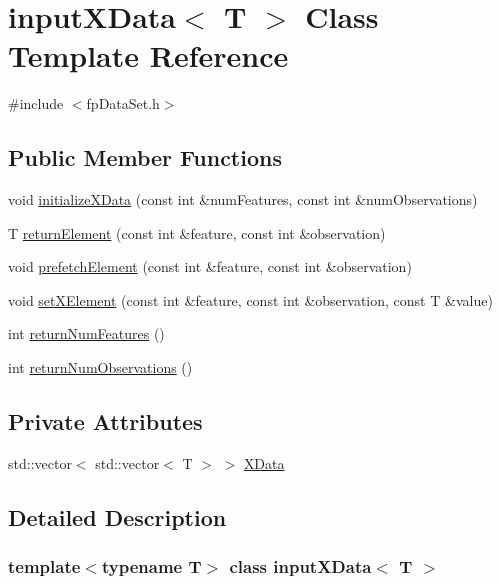 \hypertarget{classinputXData}{}\section{input\+X\+Data$<$ T $>$ Class Template Reference}
\label{classinputXData}


{\ttfamily \#include $<$fp\+Data\+Set.\+h$>$}

\subsection*{Public Member Functions}
\begin{DoxyCompactItemize}
\item 
void \hyperlink{classinputXData_a540e403a6520cb1747d0d08c7df18bf4}{initialize\+X\+Data} (const int \&num\+Features, const int \&num\+Observations)
\item 
T \hyperlink{classinputXData_a5eb6d788b282751f279605495351c42f}{return\+Element} (const int \&feature, const int \&observation)
\item 
void \hyperlink{classinputXData_a2e80664842e94288ea78bb2447b0f6f8}{prefetch\+Element} (const int \&feature, const int \&observation)
\item 
void \hyperlink{classinputXData_a8f59e3a3f79f9da1a032bffe66e182ed}{set\+X\+Element} (const int \&feature, const int \&observation, const T \&value)
\item 
int \hyperlink{classinputXData_ad10e112909314a795628784bb9fc7e8b}{return\+Num\+Features} ()
\item 
int \hyperlink{classinputXData_a127317d1c076a4a891e20386db93f008}{return\+Num\+Observations} ()
\end{DoxyCompactItemize}
\subsection*{Private Attributes}
\begin{DoxyCompactItemize}
\item 
std\+::vector$<$ std\+::vector$<$ T $>$ $>$ \hyperlink{classinputXData_aff55a72217a7a3b66df91d01840e4206}{X\+Data}
\end{DoxyCompactItemize}


\subsection{Detailed Description}
\subsubsection*{template$<$typename T$>$\newline
class input\+X\+Data$<$ T $>$}



